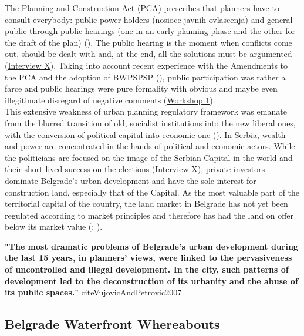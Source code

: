 \documentclass[11pt]{report}
\begin{document}
The Planning and Construction Act (PCA) prescribes that planners have to consult everybody: public power holders (nosioce javnih ovlascenja) and general public through public hearings (one in an early planning phase and the other for the draft of the plan) (\cite{PCA}).
The public hearing is the moment when conflicts come out, should be dealt with and, at the end, all the solutions must be argumented (\href{InterviewX}{Interview X}).
Taking into account recent experience with the Amendments to the PCA and the adoption of BWPSPSP (\cite{ref media all different}), public participation was rather a farce and public hearings were pure formality with obvious and maybe even illegitimate disregard of negative comments (\href{Expert Workshop}{Workshop 1}).
\\ 

This extensive weakness of urban planning regulatory framework was emanate from the blurred transition of old, socialist institutions into the new liberal ones, with the conversion of political capital into economic one (\citealt{vujovic_belgrades_2007}).
In Serbia, wealth and power are concentrated in the hands of political and economic actors. While the politicians are focused on the image of the Serbian Capital in the world and their short-lived success on the elections (\href{InterviewX}{Interview X}),
private investors dominate Belgrade's urban development and have the sole interest for construction land, especially that of the Capital. As the most valuable part of the territorial capital of the country, the land market in Belgrade has not yet been regulated according to market principles and therefore has had the land on offer below its market value (\cite{SKGO2013}; \cite{Zekovic all ref}).
    
\textbf{"The most dramatic problems of Belgrade’s urban development during the last 15 years, in planners’ views, were linked to the pervasiveness of uncontrolled and illegal development. In the city, such patterns of development led to the deconstruction of its urbanity and the abuse of its public spaces."} cite{VujovicAndPetrovic2007}

\subsection{Belgrade Waterfront Whereabouts}
\end{document}
